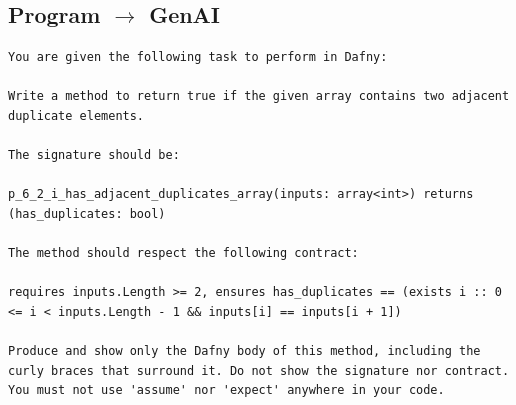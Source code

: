 \documentclass{article}
\begin{document}
\subsection*{Program $\rightarrow$ GenAI}
\begin{lstlisting}
You are given the following task to perform in Dafny:

Write a method to return true if the given array contains two adjacent duplicate elements.

The signature should be:

p_6_2_i_has_adjacent_duplicates_array(inputs: array<int>) returns (has_duplicates: bool)

The method should respect the following contract:

requires inputs.Length >= 2, ensures has_duplicates == (exists i :: 0 <= i < inputs.Length - 1 && inputs[i] == inputs[i + 1])

Produce and show only the Dafny body of this method, including the curly braces that surround it. Do not show the signature nor contract. You must not use 'assume' nor 'expect' anywhere in your code.
\end{lstlisting}
\end{document}
